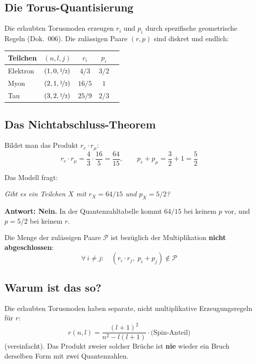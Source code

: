 \subsection{Die Torus-Quantisierung}

Die erlaubten Torusmoden erzeugen $r_i$ und $p_i$ durch spezifische
geometrische Regeln (Dok.~006). Die zulässigen Paare $(r,p)$
sind diskret und endlich:

\begin{center}
{\footnotesize
\begin{tabular}{lcccc}
\toprule
\textbf{Teilchen} & \textbf{$(n,l,j)$} & \textbf{$r_i$} & \textbf{$p_i$} \\
\midrule
Elektron & $(1,0,\nicefrac{1}{2})$ & $4/3$ & $3/2$ \\
Myon     & $(2,1,\nicefrac{1}{2})$ & $16/5$ & $1$ \\
Tau      & $(3,2,\nicefrac{1}{2})$ & $25/9$ & $2/3$ \\
\bottomrule
\end{tabular}
}
\end{center}

\subsection{Das Nichtabschluss-Theorem}

Bildet man das Produkt $r_e \cdot r_\mu$:
\[
  r_e \cdot r_\mu = \frac{4}{3} \cdot \frac{16}{5} = \frac{64}{15},
  \qquad p_e + p_\mu = \frac{3}{2} + 1 = \frac{5}{2}
\]

Das Modell fragt:
\begin{center}
  \emph{Gibt es ein Teilchen $X$ mit $r_X = 64/15$ und $p_X = 5/2$?}
\end{center}

\textbf{Antwort: Nein.} In der Quantenzahltabelle kommt $64/15$ bei
keinem $p$ vor, und $p=5/2$ bei keinem $r$.

Die Menge der zulässigen Paare $\mathcal{P}$ ist bezüglich der
Multiplikation \textbf{nicht abgeschlossen}:
\begin{equation}
  \forall\, i \neq j:\quad (r_i \cdot r_j,\; p_i + p_j) \notin \mathcal{P}
  \label{eq:nichtabschluss}
\end{equation}

\subsection{Warum ist das so?}

Die erlaubten Torusmoden haben separate, nicht multiplikative
Erzeugungsregeln für $r$:
\[
  r(n,l) = \frac{(l+1)^2}{n^2 - l(l+1)} \cdot \text{(Spin-Anteil)}
\]
(vereinfacht). Das Produkt zweier solcher Brüche ist \textbf{nie}
wieder ein Bruch derselben Form mit zwei Quantenzahlen.

